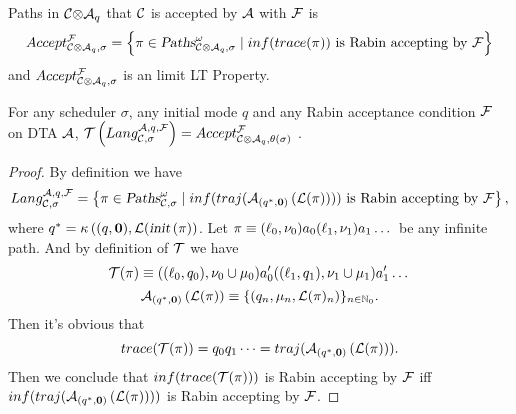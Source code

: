 
Paths in ${\mathcal{C}}{\otimes}{\mathcal{A}_q}$ that $\mathcal{C}$ is accepted by $\mathcal{A}$ with $\mathcal{F}$ is
$$
    Accept _{ {\mathcal{C}}{\otimes}{\mathcal{A}_q}, \sigma } ^{\mathcal{F}} = \left \{ 
        \pi \in \mbox{\sl Paths}^\omega_{{\mathcal{C}}{\otimes}{\mathcal{A}_q},\sigma} \mid 
        inf (  
            trace(  
                \pi
             )
         )
        \mbox{ is Rabin accepting by } \mathcal{F}
    \right\}
$$
and $Accept _{ {\mathcal{C}}{\otimes}{\mathcal{A}_q}, \sigma } ^{\mathcal{F}}$ is an limit LT Property.

\vspace{-0.8em}
\begin{proposition}\label{prop:psfunc} 
For any scheduler $\sigma$, any initial mode $q$ and any Rabin acceptance condition
$\mathcal{F}$ on DTA $\mathcal{A}$, $\mathcal{T}\left( Lang _{\mathcal{C},\sigma} ^{\mathcal{A},q,\mathcal{F}} \right) = Accept _{ {\mathcal{C}}{\otimes}{\mathcal{A}_q}, \theta \left( \sigma \right) } ^{\mathcal{F}}$ .
\end{proposition}

\begin{proof}
By definition we have
$$
    Lang _{\mathcal{C},\sigma} ^{\mathcal{A},q,\mathcal{F}} = \left \{ 
        \pi \in \mbox{\sl Paths}^\omega_{\mathcal{C},\sigma} \mid 
        inf (  
            traj (  
                {\mathcal{A}}_{\left(q^*,\mathbf{0}\right)}\left(\mathcal{L}(\pi)\right) 
             )
         )
        \mbox{ is Rabin accepting by } \mathcal{F} 
    \right\},
$$
where
$
    q^*
        =
            \kappa \left(
                (q,\mathbf{0}), 
                \mathcal{L} (
                    \mbox{\sl init}\left(\pi\right)
            \right)
$.
Let $\pi \equiv (\ell_0,\nu_0) a_0 (\ell_1,\nu_1) a_1 \dots $ be any infinite path.
And by definition of $\mathcal{T}$ we have
$$
    \mathcal{T}( \pi ) \equiv 
        ((\ell_0,q_0),\nu_0\cup\mu_0)
        a'_0
        ((\ell_1,q_1),\nu_1\cup\mu_1)
        a'_1
        \dots 
$$
$$
    {\mathcal{A}}_{\left(q^*,\mathbf{0}\right)}\left(\mathcal{L}(\pi)\right) 
        \equiv \{(q_n,\mu_n,\mathcal{L}(\pi)_{n})\}_{n\in\mathbb{N}_0}.
$$
Then it's obvious that
$$trace(  \mathcal{T}( \pi )  )
    = q_0 q_1 \dots
    = traj (  
        {\mathcal{A}}_{\left(q^*,\mathbf{0}\right)}\left(\mathcal{L}(\pi)\right) 
     ).
$$ 
Then we conclude that
$inf ( 
    trace( 
        \mathcal{T}( \pi )
     )
 )$
is Rabin accepting by $\mathcal{F}$ iff 
$
    inf (  
        traj (  
            {\mathcal{A}}_{\left(q^*,\mathbf{0}\right)}\left(\mathcal{L}(\pi)\right) 
         )
     )
$
is Rabin accepting by $\mathcal{F}$.
\end{proof}

